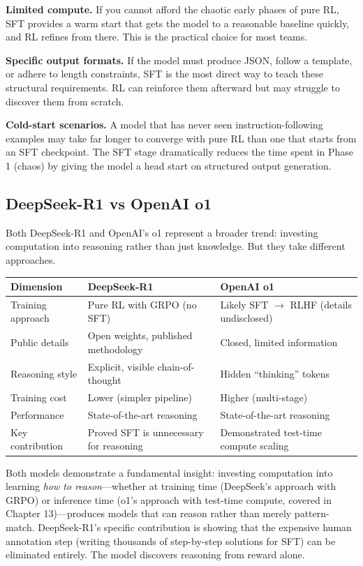 \begin{chapterenv}
\textbf{Limited compute.} If you cannot afford the chaotic early phases of pure RL, SFT provides a warm start that gets the model to a reasonable baseline quickly, and RL refines from there. This is the practical choice for most teams.

\textbf{Specific output formats.} If the model must produce JSON, follow a template, or adhere to length constraints, SFT is the most direct way to teach these structural requirements. RL can reinforce them afterward but may struggle to discover them from scratch.

\textbf{Cold-start scenarios.} A model that has never seen instruction-following examples may take far longer to converge with pure RL than one that starts from an SFT checkpoint. The SFT stage dramatically reduces the time spent in Phase 1 (chaos) by giving the model a head start on structured output generation.

\subsection{DeepSeek-R1 vs OpenAI o1}

Both DeepSeek-R1 and OpenAI's o1 represent a broader trend: investing computation into reasoning rather than just knowledge. But they take different approaches.

\begin{center}
\begin{tabular}{p{}p{}p{}}
\toprule
\textbf{Dimension} & \textbf{DeepSeek-R1} & \textbf{OpenAI o1} \\
\midrule
Training approach & Pure RL with GRPO (no SFT) & Likely SFT $\to$ RLHF (details undisclosed) \\
Public details & Open weights, published methodology & Closed, limited information \\
Reasoning style & Explicit, visible chain-of-thought & Hidden ``thinking'' tokens \\
Training cost & Lower (simpler pipeline) & Higher (multi-stage) \\
Performance & State-of-the-art reasoning & State-of-the-art reasoning \\
Key contribution & Proved SFT is unnecessary for reasoning & Demonstrated test-time compute scaling \\
\bottomrule
\end{tabular}
\end{center}

\begin{tipbox}
Both models demonstrate a fundamental insight: investing computation into learning \textit{how to reason}---whether at training time (DeepSeek's approach with GRPO) or inference time (o1's approach with test-time compute, covered in Chapter 13)---produces models that can reason rather than merely pattern-match. DeepSeek-R1's specific contribution is showing that the expensive human annotation step (writing thousands of step-by-step solutions for SFT) can be eliminated entirely. The model discovers reasoning from reward alone.
\end{tipbox}


\end{chapterenv}
